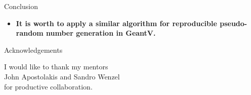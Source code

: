 \documentclass[aspectratio=169, 14pt]{beamer}
\begin{document}
\begin{large}
\begin{frame}{Conclusion}
\begin{itemize}
   \item \bf It is worth to apply a similar algorithm for reproducible pseudo-random number generation in GeantV.
  \end{itemize}

 \end{frame}
 
 \begin{frame}{Acknowledgements}

  \centering
  I would like to thank my mentors\\
  John Apostolakis and Sandro Wenzel\\
  for productive collaboration. 

 \end{frame}
 
 
 \end{large}
\end{document}
